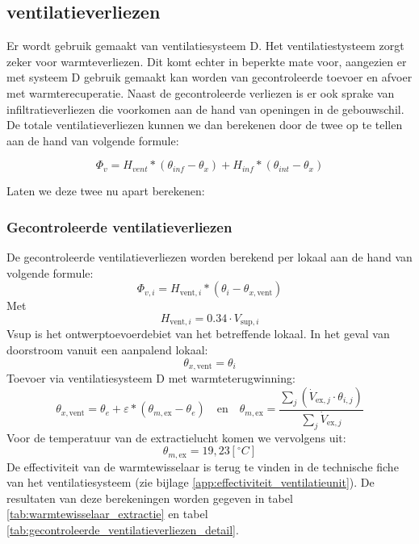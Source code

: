 \documentclass[a4paper,12pt]{article}
\begin{document}
\subsection{ventilatieverliezen}
Er wordt gebruik gemaakt van ventilatiesysteem D. Het ventilatiestysteem zorgt zeker voor warmteverliezen. Dit komt echter in beperkte mate voor, aangezien er met systeem D gebruik gemaakt kan worden van gecontroleerde toevoer en afvoer met warmterecuperatie. Naast de gecontroleerde verliezen is er ook sprake van infiltratieverliezen die voorkomen aan de hand van openingen in de gebouwschil. De totale ventilatieverliezen kunnen we dan berekenen door de twee op te tellen aan de hand van volgende formule:

\begin{equation}
    \Phi_v = H_{vent} * (\theta_{inf} - \theta_{x}) + H_{inf} * (\theta_{int} - \theta_{x} )   
\end{equation}

Laten we deze twee nu apart berekenen: 

\subsubsection{Gecontroleerde ventilatieverliezen}
De gecontroleerde ventilatieverliezen worden berekend per lokaal aan de hand van volgende formule: 
\begin{equation}
    \Phi_{v,i} = H_{\text{vent},i} * \left( \theta_i - \theta_{x,\text{vent}} \right)
    \label{eq:placeholder_label}
\end{equation}
Met %
\begin{equation*}
    H_{\text{vent}, i} = 0.34 \cdot V_{\text{sup}, i}
    \label{eq:placeholder_label}
\end{equation*}
Vsup is het ontwerptoevoerdebiet van het betreffende lokaal.
In het geval van doorstroom vanuit een aanpalend lokaal: \begin{equation}
    \theta_{x,\mathrm{vent}} = \theta_i
    \label{eq:placeholder_label}
\end{equation}
Toevoer via ventilatiesysteem D met warmteterugwinning: 
\begin{equation}
    \theta_{x,\mathrm{vent}} = \theta_e + \varepsilon \ast \left( \theta_{m,\mathrm{ex}} - \theta_e \right)
    \quad \text{en} \quad
    \theta_{m,\mathrm{ex}} = \frac{\sum_j \left( \dot{V}_{\mathrm{ex},j} \cdot \theta_{i,j} \right)}{\sum_j \dot{V}_{\mathrm{ex},j}}
    \label{eq:placeholder_label}
\end{equation}
Voor de temperatuur van de extractielucht komen we vervolgens uit:
\begin{equation}
    \theta_{m,\mathrm{ex}} =19,23 [^\circ C]
\end{equation}
De effectiviteit van de warmtewisselaar is terug te vinden in de technische fiche van het ventilatiesysteem (zie bijlage \ref{app:effectiviteit_ventilatieunit}).
De resultaten van deze berekeningen worden gegeven in tabel \ref{tab:warmtewisselaar_extractie} en tabel \ref{tab:gecontroleerde_ventilatieverliezen_detail}.
\end{document}
